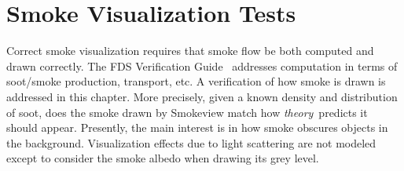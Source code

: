 \documentclass[11pt,twoside]{book}
\begin{document}





\chapter{Smoke Visualization Tests}

Correct smoke visualization requires that smoke flow be both computed and drawn correctly. The FDS Verification Guide~\cite{FDS_Verification_Guide} addresses computation in terms of soot/smoke production, transport, etc. A verification of how smoke is drawn is addressed in this chapter. More precisely, given a known density and distribution of soot, does the smoke drawn by Smokeview match how {\em theory}\ predicts it should appear.  Presently, the main interest is in how smoke obscures objects in the background.  Visualization effects due to light scattering are not modeled except to consider the smoke albedo when drawing its grey level.
\end{document}

